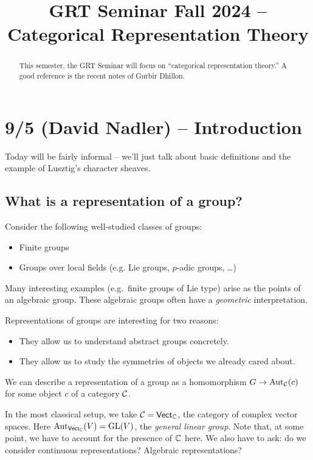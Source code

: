 \documentclass{article}
\title{GRT Seminar Fall 2024 -- Categorical Representation Theory}
\begin{document}
\maketitle

\begin{abstract}
	This semester, the GRT Seminar will focus on ``categorical representation theory.''
	A good reference is the recent notes of Gurbir Dhillon.
\end{abstract}

\tableofcontents

\section{9/5 (David Nadler) -- Introduction}

Today will be fairly informal -- we'll just talk about basic definitions and the example of Lusztig's character sheaves.

\subsection{What is a representation of a group?}

Consider the following well-studied classes of groups:
\begin{itemize}
	\item Finite groups
	\item Groups over local fields (e.g. Lie groups, $p$-adic groups, \dots)
\end{itemize}
Many interesting examples (e.g.\ finite groups of Lie type) arise as the points of an algebraic group.
These algebraic groups often have a \emph{geometric} interpretation.

Representations of groups are interesting for two reasons:
\begin{itemize}
	\item They allow us to understand abstract groups concretely.
	\item They allow us to study the symmetries of objects we already cared about.
\end{itemize}
We can describe a representation of a group as a homomorphism $G \to \operatorname{Aut}_{\mathcal{C}}(c)$ for some object $c$ of a category $\mathcal{C}$.

\begin{ex}
	In the most classical setup, we take $\mathcal{C} = \mathsf{Vect}_{\mathbb{C}}$, the category of complex vector spaces.
	Here $\operatorname{Aut}_{\mathsf{Vect}_{\mathbb{C}}}(V) = \operatorname{GL}(V)$, the \emph{general linear group}.
	Note that, at some point, we have to account for the presence of $\mathbb{C}$ here.
	We also have to ask: do we consider continuous representations? Algebraic representations?
\end{ex}
\end{document}
